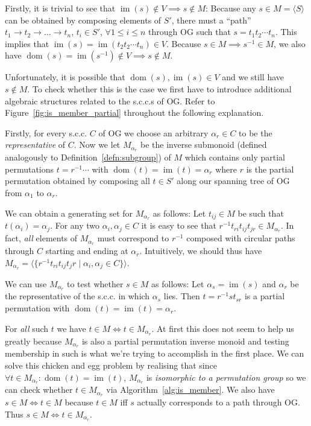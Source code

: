 Firstly, it is trivial to see that $\operatorname{im}(s) \notin V \implies s
\notin M$: Because any $s \in M = \langle S \rangle$ can be obtained by
composing elements of $S'$, there must a ``path'' $t_1 \rightarrow t_2
\rightarrow \dots \rightarrow t_n$, $t_i \in S'$, $\forall 1 \leq i \leq n$
through $\mathrm{OG}$ such that $s = t_1 t_2 \cdots t_n$. This implies that
$\operatorname{im}(s) = \operatorname{im}(t_2 t_2 \cdots t_n) \in V$. Because
$s \in M \implies s^{-1} \in M$, we also have $\operatorname{dom}(s) =
\operatorname{im}(s^{-1}) \notin V \implies s \notin M$.

Unfortunately, it is possible that $\operatorname{dom}(s), \operatorname{im}(s)
\in V$ and we still have $s \notin M$. To check whether this is the case we
first have to introduce additional algebraic structures related to the s.c.c.s
of $\mathrm{OG}$. Refer to Figure~\ref{fig:is_member_partial} throughout the
following explanation.

Firstly, for every s.c.c. $C$ of $\mathrm{OG}$ we choose an arbitrary $\alpha_r
\in C$ to be the \textit{representative} of $C$.
%
Now we let $M_{\alpha_r}$ be the inverse submonoid (defined analogously to
Definition~\ref{defn:subgroup}) of $M$ which contains only partial permutations
$t = r^{-1} \cdots $ with $\operatorname{dom}(t) = \operatorname{im}(t) =
\alpha_r$ where $r$ is the partial permutation obtained by composing all $t \in
S'$ along our spanning tree of $\mathrm{OG}$ from $\alpha_1$ to $\alpha_r$.

We can obtain a generating set for $M_{\alpha_r}$ as follows: Let $t_{ij}
\in M$ be such that $t(\alpha_i) = \alpha_j$.
%
For any two $\alpha_i, \alpha_j \in C$ it is easy to see that $r^{-1} t_{ri}
t_{ij} t_{jr} \in M_{\alpha_r}$. In fact, \textit{all} elements of
$M_{\alpha_r}$ must correspond to $r^{-1}$ composed with circular paths through
$C$ starting and ending at $\alpha_r$. Intuitively, we should thus have
$M_{\alpha_r} = \langle\{r^{-1} t_{ri} t_{ij} t_jr \mid \alpha_i,\alpha_j \in
C\}\rangle$.

We can use $M_{\alpha_r}$ to test whether $s \in M$ as follows: Let $\alpha_s =
\operatorname{im}(s)$ and $\alpha_r$ be the representative of the s.c.c. in
which $\alpha_s$ lies. Then $t = r^{-1} s t_{sr}$ is a partial permutation with
$\operatorname{dom}(t) = \operatorname{im}(t) = \alpha_r$.

For \textit{all} such $t$ we have $t \in M \iff t \in M_{\alpha_r}$. At first
this does not seem to help us greatly because $M_{\alpha_r}$ is also a partial
permutation inverse monoid and testing membership in such is what we're trying
to accomplish in the first place. We can solve this chicken and egg problem by
realising that since $\forall t \in M_{\alpha_r}: \operatorname{dom}(t) =
\operatorname{im}(t)$, $M_{\alpha_r}$ is \textit{isomorphic to a permutation
group} so we can check whether $t \in M_{\alpha_r}$ via
Algorithm~\ref{alg:is_member}. We also have $s \in M \iff t \in M$
because $t \in M$ iff $s$ actually corresponds to a path through
$\mathrm{OG}$. Thus $s \in M \iff t \in M_{\alpha_r}$.

